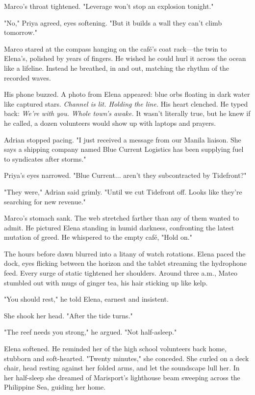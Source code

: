 Marco's throat tightened. "Leverage won't stop an explosion tonight."

"No," Priya agreed, eyes softening. "But it builds a wall they can't climb tomorrow."

Marco stared at the compass hanging on the café's coat rack—the twin to Elena's, polished by years of fingers. He wished he could hurl it across the ocean like a lifeline. Instead he breathed, in and out, matching the rhythm of the recorded waves.

His phone buzzed. A photo from Elena appeared: blue orbs floating in dark water like captured stars. \textit{Channel is lit. Holding the line.} His heart clenched. He typed back: \textit{We're with you. Whole town's awake.} It wasn't literally true, but he knew if he called, a dozen volunteers would show up with laptops and prayers.

Adrian stopped pacing. "I just received a message from our Manila liaison. She says a shipping company named Blue Current Logistics has been supplying fuel to syndicates after storms."

Priya's eyes narrowed. "Blue Current... aren't they subcontracted by Tidefront?"

"They were," Adrian said grimly. "Until we cut Tidefront off. Looks like they're searching for new revenue."

Marco's stomach sank. The web stretched farther than any of them wanted to admit. He pictured Elena standing in humid darkness, confronting the latest mutation of greed. He whispered to the empty café, "Hold on."

\bigskip

The hours before dawn blurred into a litany of watch rotations. Elena paced the dock, eyes flicking between the horizon and the tablet streaming the hydrophone feed. Every surge of static tightened her shoulders. Around three a.m., Mateo stumbled out with mugs of ginger tea, his hair sticking up like kelp.

"You should rest," he told Elena, earnest and insistent.

She shook her head. "After the tide turns."

"The reef needs you strong," he argued. "Not half-asleep."

Elena softened. He reminded her of the high school volunteers back home, stubborn and soft-hearted. "Twenty minutes," she conceded. She curled on a deck chair, head resting against her folded arms, and let the soundscape lull her. In her half-sleep she dreamed of Marisport's lighthouse beam sweeping across the Philippine Sea, guiding her home.

